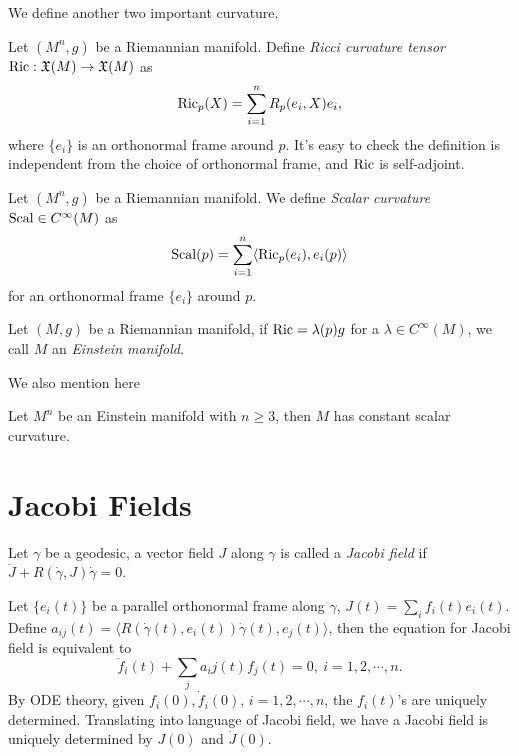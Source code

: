 We define another two important curvature.
\begin{defn}
    Let $(M^n,g)$ be a Riemannian manifold.
    Define \emph{Ricci curvature tensor} $\operatorname{Ric}:\mathfrak{X}(M)\to\mathfrak{X}(M)$ as
    \[\operatorname{Ric}_p(X)=\sum_{i=1}^nR_p(e_i,X)e_i,\]
    where $\{e_i\}$ is an orthonormal frame around $p$.
    It's easy to check the definition is independent from the choice of orthonormal frame, and $\operatorname{Ric}$ is self-adjoint.
\end{defn}

\begin{defn}
    Let $(M^n,g)$ be a Riemannian manifold.
    We define \emph{Scalar curvature} $\operatorname{Scal}\in C^\infty(M)$ as
    \[\operatorname{Scal}(p)=\sum_{i=1}^n\langle\operatorname{Ric}_p(e_i),e_i(p)\rangle\]
    for an orthonormal frame $\{e_i\}$ around $p$.
\end{defn}

\begin{defn}
    Let $(M,g)$ be a Riemannian manifold, if $\operatorname{Ric}=\lambda(p)g$ for a $\lambda\in C^\infty(M)$, we call $M$ an \emph{Einstein manifold}.
\end{defn}

We also mention here
\begin{thm}[Schur]
    Let $M^n$ be an Einstein manifold with $n\geq 3$, then $M$ has constant scalar curvature.    
\end{thm}

\section{Jacobi Fields}

\begin{defn}
    Let $\gamma$ be a geodesic, a vector field $J$ along $\gamma$ is called a \emph{Jacobi field} if $\ddot{J}+R(\dot{\gamma},J)\dot{\gamma}=0$.
\end{defn}

Let $\{e_i(t)\}$ be a parallel orthonormal frame along $\gamma$, $J(t)=\sum_if_i(t)e_i(t)$.
Define $a_{ij}(t)=\langle R(\dot{\gamma}(t),e_i(t))\dot{\gamma}(t),e_j(t)\rangle$, then the equation for Jacobi field is equivalent to
\[\ddot{f}_i(t)+\sum_ja_ij(t)f_j(t)=0,\ i=1,2,\cdots,n.\]
By ODE theory, given $f_i(0),\dot{f}_i(0)$, $i=1,2,\cdots,n$, the $f_i(t)$'s are uniquely determined.
Translating into language of Jacobi field, we have a Jacobi field is uniquely determined by $J(0)$ and $\dot{J}(0)$.

